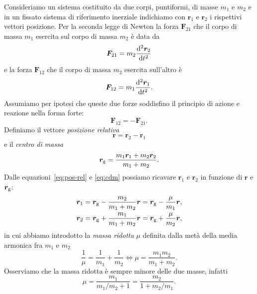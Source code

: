 Consideriamo un sistema costituito da due corpi, puntiformi, di masse $m_1$ e
$m_2$ e in un fissato sistema di riferimento inerziale indichiamo con $\bm{r}_1$
e $\bm{r}_2$ i rispettivi vettori posizione. Per la seconda legge di Newton la
forza $\bm{F}_{21}$ che il corpo di massa $m_1$ esercita sul corpo di massa
$m_2$ è data da
\begin{equation}
  \label{eq:f21}
  \bm{F}_{21} = m_2\toder[2]{\bm{r}_2}{t}
\end{equation}
e la forza $\bm{F}_{12}$ che il corpo di massa $m_2$ esercita sull'altro è
\begin{equation}
  \label{eq:f12}
  \bm{F}_{12} = m_1\toder[2]{\bm{r}_1}{t}.
\end{equation}
Assumiamo per ipotesi che queste due forze soddisfino il principio di azione e
reazione nella forma forte:
\begin{equation}
  \label{eq:az-reaz}
  \bm{F}_{12} = -\bm{F}_{21}.
\end{equation}
Definiamo il vettore \emph{posizione relativa}
\begin{equation}
  \label{eq:pos-rel}
  \bm{r}=\bm{r}_2-\bm{r}_1
\end{equation}
e il \emph{centro di massa}
\begin{equation}
  \label{eq:cdm}
  \bm{r}_\textup{g} = \frac{m_1\bm{r}_1+m_2\bm{r}_2}{m_1+m_2}.
\end{equation}
Dalle equazioni~\eqref{eq:pos-rel} e \eqref{eq:cdm} possiamo ricavare $\bm{r}_1$
e $\bm{r}_2$ in funzione di $\bm{r}$ e $\bm{r}_\textup{g}$:
\begin{subequations}
  \begin{align}
    \bm{r}_1 &= \bm{r}_\textup{g} - \frac{m_2}{m_1+m_2}\bm{r} =
    \bm{r}_\textup{g} - \frac{\mu}{m_1}\bm{r},\\
    \bm{r}_2 &= \bm{r}_\textup{g} + \frac{m_1}{m_1+m_2}\bm{r} =
    \bm{r}_\textup{g} + \frac{\mu}{m_2}\bm{r},
  \end{align}
\end{subequations}
in cui abbiamo introdotto la \emph{massa ridotta} $\mu$ definita dalla metà
della media armonica fra $m_1$ e $m_2$
\begin{equation}
  \frac{1}{\mu} = \frac{1}{m_1} + \frac{1}{m_2} \iff \mu=\frac{m_1m_2}{m_1+m_2}.
\end{equation}
Osserviamo che la massa ridotta è sempre minore delle due masse, infatti
\begin{equation}
  \mu =\frac{m_1}{m_1/m_2+1} = \frac{m_2}{1+m_2/m_1}.
\end{equation}
